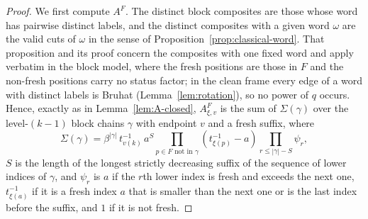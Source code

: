 \documentclass[11pt]{article}
\begin{document}
\begin{proof}
We first compute $A^F$. The distinct block composites are those whose
word has pairwise distinct labels, and the distinct composites with a
given word $\omega$ are the valid cuts of $\omega$ in the sense of
Proposition~\ref{prop:classical-word}. That proposition and its proof
concern the composites with one fixed word and apply verbatim in the
block model, where the fresh positions are those in $F$ and the
non-fresh positions carry no status factor; in the clean frame every
edge of a word with distinct labels is Bruhat (Lemma~\ref{lem:rotation}),
so no power of $q$ occurs. Hence, exactly as in Lemma~\ref{lem:A-closed},
$A^F_{\xi,v}$ is the sum of $\Sigma(\gamma)$ over the level-$(k-1)$
block chains $\gamma$ with endpoint $v$ and a fresh suffix, where
\[
 \Sigma(\gamma)=\beta^{|\gamma|}\,t^{-1}_{v(k)}\,a^{S}
 \prod_{p\in F\text{ not in }\gamma}(t^{-1}_{\xi(p)}-a)\prod_{r\leq|\gamma|-S}\psi_r ,
\]
$S$ is the length of the longest strictly decreasing suffix of the
sequence of lower indices of $\gamma$, and $\psi_r$ is $a$ if the $r$th
lower index is fresh and exceeds the next one, $t^{-1}_{\xi(a)}$ if it
is a fresh index $a$ that is smaller than the next one or is the last
index before the suffix, and $1$ if it is not fresh.


\end{proof}
\end{document}
